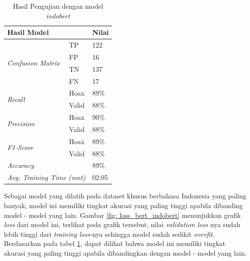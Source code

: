 \begin{table}[h]
    \caption{Hasil Pengujian dengan model \textit{indobert}}
    \label{tab: loss_indobert}
    \centering
    \begin{tabular}{|l|l|l|}
        \hline
        \multicolumn{2}{|l|}{\textbf{Hasil Model}}              & \textbf{Nilai}        \\ \hline
        \multirow{4}{*}{\textit{Confusion Matrix}}              & TP             & 122  \\ \cline{2-3}
                                                                & FP             & 16   \\ \cline{2-3}
                                                                & TN             & 137  \\ \cline{2-3}
                                                                & FN             & 17   \\ \hline
        \multirow{2}{*}{\textit{Recall}}                        & Hoax           & 89\% \\ \cline{2-3}
                                                                & Valid          & 88\% \\ \hline
        \multirow{2}{*}{\textit{Precision}}                     & Hoax           & 90\% \\ \cline{2-3}
                                                                & Valid          & 88\% \\ \hline
        \multirow{2}{*}{\textit{F1-Score}}                      & Hoax           & 89\% \\ \cline{2-3}
                                                                & Valid          & 88\% \\ \hline
        \multicolumn{2}{|l|}{\textit{Accuracy}}                 & 89\%                  \\ \hline
        \multicolumn{2}{|l|}{\textit{Avg. Training Time (mnt)}} & 02:05                 \\ \hline
    \end{tabular}
\end{table}

Sebagai model yang dilatih pada dataset khusus berbahasa Indonesia yang paling banyak, model ini memiliki tingkat akurasi yang paling tinggi apabila dibanding model - model yang lain. Gambar \ref{fig: loss_bert_indobert} menunjukkan grafik \textit{loss} dari model ini, terlihat pada grafik tersebut, nilai \textit{validation loss} nya sudah lebih tinggi dari \textit{training loss}-nya sehingga model sudah sedikit \textit{overfit}. Berdasarkan pada tabel \ref{tab: loss_indobert}, dapat dilihat bahwa model ini memiliki tingkat akurasi yang paling tinggi apabila dibandingkan dengan model - model yang lain.

